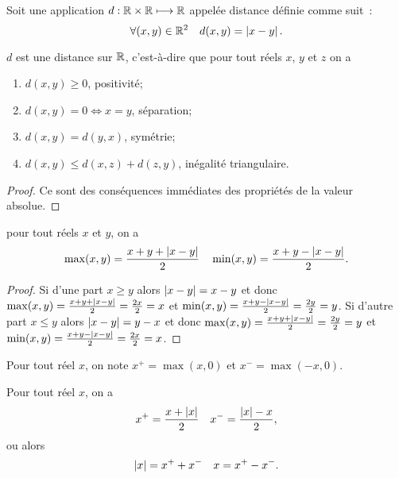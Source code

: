   \begin{defdef}
    Soit une application \(d:\mathbb{R}\times\mathbb{R}\longmapsto \mathbb{R}\) appelée distance définie 
    comme suit~:
    \begin{equation}
      \forall (x,y) \in \mathbb{R}^2 \quad d(x,y)=\left\lvert x-y\right\rvert.
    \end{equation}
  \end{defdef}
  \begin{prop}
    \(d\) est une distance sur \(\mathbb{R}\), c'est-à-dire que pour tout réels \(x\), 
    \(y\) et \(z\) on a
    \begin{enumerate}
      \item \(d(x,y)\geqslant 0\), positivité;
      \item \(d(x,y)=0 \iff x=y\), séparation;
      \item \(d(x,y)=d(y,x)\), symétrie;
      \item \(d(x,y)\leqslant d(x,z)+d(z,y)\), inégalité triangulaire.
    \end{enumerate}
  \end{prop}
  \begin{proof}
    Ce sont des conséquences immédiates des propriétés de la valeur absolue.
  \end{proof}
  \begin{prop}
    pour tout réels \(x\) et \(y\), on a
    \begin{equation}
      \max(x,y)=\frac{x+y+\left\lvert x-y\right\rvert}{2} \quad \min(x,y)=\frac{x+y-\left\lvert x-y\right\rvert}{2}.
    \end{equation}
  \end{prop}
  \begin{proof}
    Si d'une part \(x\geqslant y\) alors \(\left\lvert x-y\right\rvert=x-y\) et donc 
    \(\max(x,y)=\frac{x+y+\left\lvert x-y\right\rvert}{2}=\frac{2x}{2}=x\) et 
    \(\min(x,y)=\frac{x+y-\left\lvert x-y\right\rvert}{2}=\frac{2y}{2}=y\). Si d'autre part 
    \(x\leqslant y\) alors \(\left\lvert x-y\right\rvert=y-x\) et donc 
    \(\max(x,y)=\frac{x+y+\left\lvert x-y\right\rvert}{2}=\frac{2y}{2}=y\) et 
    \(\min(x,y)=\frac{x+y-\left\lvert x-y\right\rvert}{2}=\frac{2x}{2}=x\).
  \end{proof}
  \begin{defdef}
    Pour tout réel \(x\), on note \(x^+=\max(x,0)\) et \(x^-=\max(-x,0)\).
  \end{defdef}
  \begin{prop}
    Pour tout réel \(x\), on a
    \begin{equation}
      x^+=\frac{x+\left\lvert x\right\rvert}{2} \quad x^-=\frac{\left\lvert x\right\rvert-x}{2},
    \end{equation}
    ou alors
    \begin{equation}
      \left\lvert x\right\rvert=x^++x^- \quad x=x^+-x^-.
    \end{equation}
  \end{prop}
